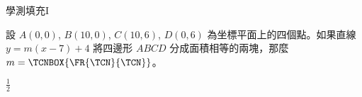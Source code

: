     \begin{QUESTION}
        \begin{ExamInfo}{95}{學測}{填充}{I}
        \end{ExamInfo}
        \begin{ExamAnsRateInfo}{25}{56}{12}{7}
        \end{ExamAnsRateInfo}
        \begin{QBODY}
            設 $A(0,0)$, $B(10,0)$, $C(10,6)$, $D(0,6)$ 為坐標平面上的四個點。如果直線 $y=m(x-7)+4$ 將四邊形 $ABCD$ 分成面積相等的兩塊，那麼 $m= \TCNBOX{\FR{\TCN}{\TCN}}$。
        \end{QBODY}
        \begin{QFROMS}
        \end{QFROMS}
        \begin{QTAGS}\end{QTAGS}
        \begin{QANS}
            $ \frac{1}{2}$
        \end{QANS}
        \begin{QSOLLIST}
        \end{QSOLLIST}
        \begin{QEMPTYSPACE}
        \end{QEMPTYSPACE}
    \end{QUESTION}
